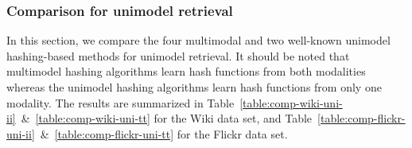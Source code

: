 \subsubsection{Comparison for unimodel retrieval}
\label{smh:exps:results:uni}

In this section, we compare the four multimodal and two well-known unimodel hashing-based methods for unimodel retrieval.  It should be noted that multimodel hashing algorithms learn hash functions from both modalities whereas the unimodel hashing algorithms learn hash functions from only one modality. The results are summarized in Table~\ref{table:comp-wiki-uni-ii}~\&~\ref{table:comp-wiki-uni-tt} for the \mbox{Wiki} data set, and Table~\ref{table:comp-flickr-uni-ii}~\&~\ref{table:comp-flickr-uni-tt} for the \mbox{Flickr} data set.

